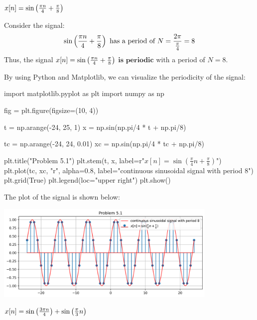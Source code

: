 \documentclass[a4paper, 10pt]{article}
\begin{document}
\begin{subproblems}
    \item \( x[n] = \sin \left( \frac{\pi n}{4} + \frac{\pi}{8}\right) \)
\end{subproblems}

\begin{solution}
Consider the signal:
\[
\sin \left( \frac{\pi n}{4} + \frac{\pi}{8}\right) \text{ has a period of } N = \frac{2\pi}{\frac{\pi}{4}} = 8
\]
Thus, the signal \( x[n] = \sin \left( \frac{\pi n}{4} + \frac{\pi}{8}\right) \) \( \boxed{\textbf{is periodic}} \) with a period of \( \boxed{N = 8} \).

\vspace{5mm}

By using Python and Matplotlib, we can visualize the periodicity of the signal:
\begin{codingbox}
import matplotlib.pyplot as plt
import numpy as np

fig = plt.figure(figsize=(10, 4))

t = np.arange(-24, 25, 1)
x = np.sin(np.pi/4 * t + np.pi/8)

tc = np.arange(-24, 24, 0.01)
xc = np.sin(np.pi/4 * tc + np.pi/8)

plt.title("Problem 5.1")
plt.stem(t, x, label=r"$x[n] = \sin(\frac{\pi}{4} n + \frac{\pi}{8})$")
plt.plot(tc, xc, "r", alpha=0.8, label="continuous sinusoidal signal with period 8")
plt.grid(True)
plt.legend(loc="upper right")
plt.show()
\end{codingbox}

The plot of the signal is shown below:
\begin{center}
    \includegraphics[width=0.8\textwidth]{images/problem_5_1.png}
\end{center}
\end{solution}

\newpage

\begin{subproblems}[start=2]
    \item \( x[n] = \sin \left( \frac{3\pi n}{4} \right) + \sin\left( \frac{\pi}{3}n \right) \)
\end{subproblems}
\end{document}
